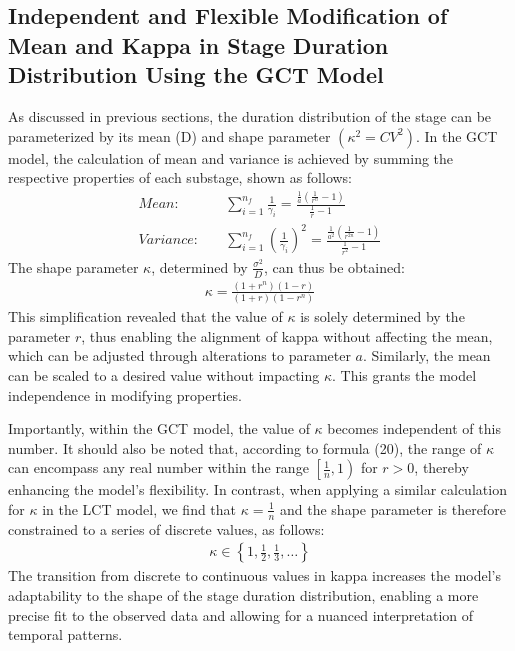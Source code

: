 \documentclass[12pt]{article}
\begin{document}
\subsection{Independent and Flexible Modification of Mean and Kappa in Stage Duration Distribution Using the GCT Model}
\label{parm result}
As discussed in previous sections, the duration distribution of the stage can be parameterized by its mean (D) and shape parameter $(\kappa^2 = CV^2)$. In the GCT model, the calculation of mean and variance is achieved by summing the respective properties of each substage, shown as follows:
\begin{align}
    Mean: \quad  &\sum_{i=1}^{n_f} \frac{1}{\gamma_i} = \frac{\frac{1}{a} (\frac{1}{r^n} - 1)}{\frac{1}{r} -1} \\
    Variance: \quad &\sum_{i=1}^{n_f} \left(\frac{1}{\gamma_i} \right)^2 = \frac{\frac{1}{a^2} (\frac{1}{r^{2n}} - 1)}{\frac{1}{r^2} -1}
\end{align}
The shape parameter $\kappa$, determined by $\frac{\sigma^2}{D}$, can thus be obtained:
\begin{align}
    \kappa = \frac{(1+r^{n}) (1-r)}{(1+r) (1-r^{n})}
\end{align}
This simplification revealed that the value of $\kappa$ is solely determined by the parameter $r$, thus enabling the alignment of kappa without affecting the mean, which can be adjusted through alterations to parameter $a$. Similarly, the mean can be scaled to a desired value without impacting $\kappa$. This grants the model independence in modifying properties.

Importantly, within the GCT model, the value of $\kappa$ becomes independent of this number. It should also be noted that, according to formula (20), the range of $\kappa$ can encompass any real number within the range $\left[ \frac{1}{n}, 1 \right)$ for $r > 0$, thereby enhancing the model's flexibility. In contrast, when applying a similar calculation for $\kappa$ in the LCT model, we find that $\kappa = \frac{1}{n}$ and the shape parameter is therefore constrained to a series of discrete values, as follows:
\begin{align*}
    \kappa \in \left\{ 1, \frac{1}{2}, \frac{1}{3}, \dots \right\}
\end{align*}
The transition from discrete to continuous values in kappa increases the model's adaptability to the shape of the stage duration distribution, enabling a more precise fit to the observed data and allowing for a nuanced interpretation of temporal patterns.
\end{document}
